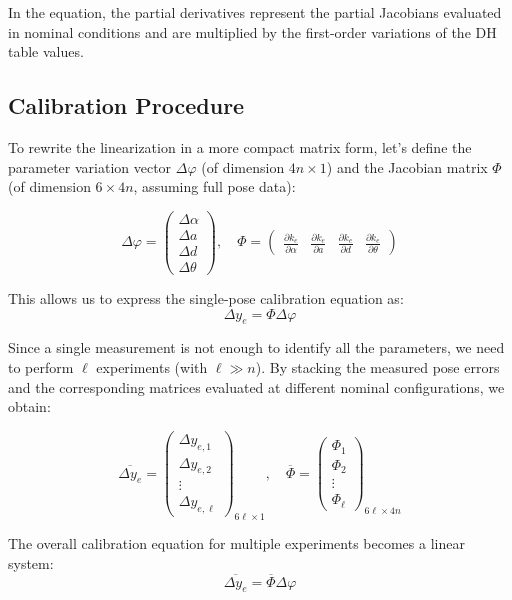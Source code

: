 In the equation, the partial derivatives represent the partial Jacobians evaluated in nominal conditions and 
are multiplied by the first-order variations of the DH table values.

\subsection{Calibration Procedure}
To rewrite the linearization in a more compact matrix form, 
let's define the parameter variation vector $\Delta \varphi$ (of dimension $4n \times 1$) 
and the Jacobian matrix $\Phi$ (of dimension $6 \times 4n$, assuming full pose data):

$$
\Delta \varphi = 
\begin{pmatrix}
\Delta \alpha \\
\Delta a \\
\Delta d \\
\Delta \theta
\end{pmatrix}, \quad
\Phi = 
\begin{pmatrix}
\frac{\partial k_e}{\partial \alpha} & \frac{\partial k_e}{\partial a} & \frac{\partial k_e}{\partial d} & \frac{\partial k_e}{\partial \theta}
\end{pmatrix}
$$

This allows us to express the single-pose calibration equation as:
$$
\Delta y_e = \Phi \Delta \varphi
$$

Since a single measurement is not enough to identify all the parameters, 
we need to perform $\ell$ experiments (with $\ell \gg n$). By stacking the measured pose errors and 
the corresponding matrices evaluated at different nominal configurations, we obtain:

$$
\overline{\Delta y_e} = 
\begin{pmatrix}
\Delta y_{e,1} \\
\Delta y_{e,2} \\
\vdots \\
\Delta y_{e,\ell}
\end{pmatrix}_{6\ell \times 1}, \quad
\overline{\Phi} = 
\begin{pmatrix}
\Phi_1 \\
\Phi_2 \\
\vdots \\
\Phi_\ell
\end{pmatrix}_{6\ell \times 4n}
$$

The overall calibration equation for multiple experiments becomes a linear system:
$$
\overline{\Delta y_e} = \overline{\Phi} \Delta \varphi
$$

